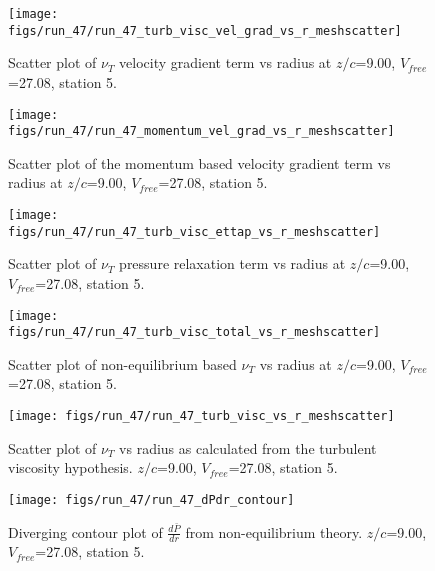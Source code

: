 \begin{figure}[H]
\centering
\texttt{[image: figs/run\_47/run\_47\_turb\_visc\_vel\_grad\_vs\_r\_meshscatter]}
\caption{Scatter plot of $\nu_T$ velocity gradient term vs radius at $z/c$=9.00, $V_{free}$=27.08, station 5.}
\end{figure}


\begin{figure}[H]
\centering
\texttt{[image: figs/run\_47/run\_47\_momentum\_vel\_grad\_vs\_r\_meshscatter]}
\caption{Scatter plot of the momentum based velocity gradient term vs radius at $z/c$=9.00, $V_{free}$=27.08, station 5.}
\end{figure}


\begin{figure}[H]
\centering
\texttt{[image: figs/run\_47/run\_47\_turb\_visc\_ettap\_vs\_r\_meshscatter]}
\caption{Scatter plot of $\nu_T$ pressure relaxation term vs radius at $z/c$=9.00, $V_{free}$=27.08, station 5.}
\end{figure}


\begin{figure}[H]
\centering
\texttt{[image: figs/run\_47/run\_47\_turb\_visc\_total\_vs\_r\_meshscatter]}
\caption{Scatter plot of non-equilibrium based $\nu_T$ vs radius at $z/c$=9.00, $V_{free}$=27.08, station 5.}
\end{figure}


\begin{figure}[H]
\centering
\texttt{[image: figs/run\_47/run\_47\_turb\_visc\_vs\_r\_meshscatter]}
\caption{Scatter plot of $\nu_T$ vs radius as calculated from the turbulent viscosity hypothesis. $z/c$=9.00, $V_{free}$=27.08, station 5.}
\end{figure}


\begin{figure}[H]
\centering
\texttt{[image: figs/run\_47/run\_47\_dPdr\_contour]}
\caption{Diverging contour plot of $\frac{d\bar{P}}{dr}$ from non-equilibrium theory. $z/c$=9.00, $V_{free}$=27.08, station 5.}
\end{figure}


